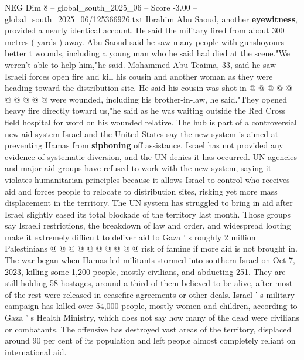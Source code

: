\begin{textsample}{NEG Dim 8 – global\_south\_2025\_06 – Score -3.00 – global\_south\_2025\_06/125366926.txt}
Ibrahim Abu Saoud, another \textbf{eyewitness}, provided a nearly identical account.
He said the military fired from about 300 metres ( yards ) away.
Abu Saoud said he saw many people with gunshoyours better t wounds, including a young man who he said had died at the scene."We weren't able to help him,"he said.
Mohammed Abu Teaima, 33, said he saw Israeli forces open fire and kill his cousin and another woman as they were heading toward the distribution site.
He said his cousin was shot in @ @ @ @ @ @ @ @ @ @ were wounded, including his brother-in-law, he said."They opened heavy fire directly toward us,"he said as he was waiting outside the Red Cross field hospital for word on his wounded relative.
The hub is part of a controversial new aid system Israel and the United States say the new system is aimed at preventing Hamas from \textbf{siphoning} off assistance.
Israel has not provided any evidence of systematic diversion, and the UN denies it has occurred.
UN agencies and major aid groups have refused to work with the new system, saying it violates humanitarian principles because it allows Israel to control who receives aid and forces people to relocate to distribution sites, risking yet more mass displacement in the territory.
The UN system has struggled to bring in aid after Israel slightly eased its total blockade of the territory last month.
Those groups say Israeli restrictions, the breakdown of law and order, and widespread looting make it extremely difficult to deliver aid to Gaza ' s roughly 2 million Palestinians @ @ @ @ @ @ @ @ @ @ risk of famine if more aid is not brought in.
The war began when Hamas-led militants stormed into southern Israel on Oct 7, 2023, killing some 1,200 people, mostly civilians, and abducting 251.
They are still holding 58 hostages, around a third of them believed to be alive, after most of the rest were released in ceasefire agreements or other deals.
Israel ' s military campaign has killed over 54,000 people, mostly women and children, according to Gaza ' s Health Ministry, which does not say how many of the dead were civilians or combatants.
The offensive has destroyed vast areas of the territory, displaced around 90 per cent of its population and left people almost completely reliant on international aid.

\end{textsample}
